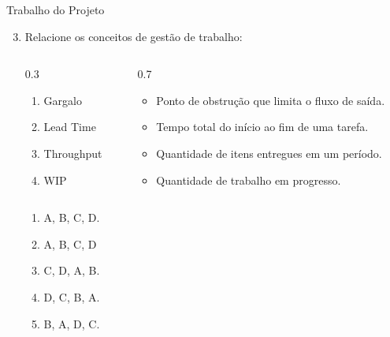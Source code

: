 \documentclass{beamer}
\begin{document}
\begin{frame}{Trabalho do Projeto}
	\begin{enumerate}
		\setcounter{enumi}{2}
		\justifying
		\item Relacione os conceitos de gestão de trabalho:
		\begin{columns}
			\begin{column}{0.3\textwidth}
				\begin{enumerate}[A]
					\item Gargalo
					\item Lead Time
					\item Throughput
					\item WIP
				\end{enumerate}
			\end{column}
			\begin{column}{0.7\textwidth}
				\begin{itemize}
					\item Ponto de obstrução que limita o fluxo de saída.
					\item Tempo total do início ao fim de uma tarefa.
					\item Quantidade de itens entregues em um período.
					\item Quantidade de trabalho em progresso.
				\end{itemize}
			\end{column}
		\end{columns}
		\begin{enumerate}[a]
			\item A, B, C, D.
			\item \alert<2>{A, B, C, D}
			\item C, D, A, B.
			\item D, C, B, A.
			\item B, A, D, C.
		\end{enumerate}
	\end{enumerate}
\end{frame}
\end{document}
